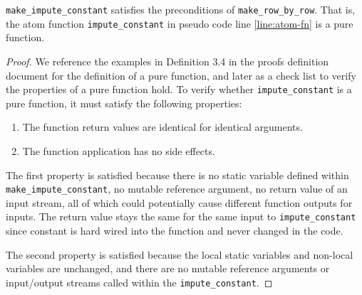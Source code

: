 \begin{lemma}\label{lemma:pure-fn}
\texttt{make\_impute\_constant} satisfies the preconditions of \texttt{make\_row\_by\_row}. That is, the atom function \texttt{impute\_constant} in pseudo code line \ref{line:atom-fn} is a pure function. 
\end{lemma}
\begin{proof}
We reference the examples in Definition 3.4 in the proofs definition document for the definition of a pure function, and later as a check list to verify the properties of a pure function hold. To verify whether \texttt{impute\_constant} is a pure function, it must satisfy the following properties:
\begin{enumerate}
    \item The function return values are identical for identical arguments.
    \item The function application has no side effects.
\end{enumerate}

The first property is satisfied because there is no static variable defined within \\\texttt{make\_impute\_constant}, no mutable reference argument, no return value of an input stream, all of which could potentially cause different function outputs for inputs. The return value stays the same for the same input to \texttt{impute\_constant} since constant is hard wired into the function and never changed in the code. 

The second property is satisfied because the local static variables and non-local variables are unchanged, and there are no mutable reference arguments or input/output streams called within the \texttt{impute\_constant}.
\end{proof}

